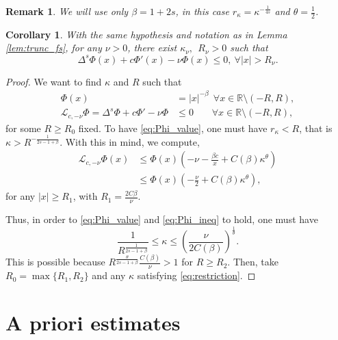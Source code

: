 \documentclass[11pt,a4paper]{amsart}
\newcommand{\Lop}{\mathcal{L}}
\newcommand{\R}{\mathbb{R}}
\newtheorem{cor}[thm]{Corollary}
\newtheorem{rmk}{Remark}
\begin{document}
\begin{rmk}
We will use only $\beta = 1+2s$, in this case $r_{\kappa} = \kappa^{-\frac{1}{4s}}$ and $\theta=\frac12$.
\end{rmk}

\begin{cor}
\label{cor:supersol}
With the same hypothesis and notation as in Lemma \ref{lem:trunc_fs}, for any $\nu > 0$, there exist $\kappa_{\nu},~~R_{\nu}>0$ such that 
\[\Delta^s \Phi(x) + c\Phi'(x) - \nu \Phi(x) \leq 0, ~ \forall |x|>R_{\nu}.\]
\end{cor}

\begin{proof}
We want to find $\kappa$ and $R$ such that
\begin{subequations}
\label{eq:Phi_supersol}
\begin{align}
\Phi(x) &= |x|^{-\beta} ~~ \forall x\in \R \setminus (-R,R), \label{eq:Phi_value}\\
\Lop_{c,-\nu}\Phi = \Delta^s \Phi +c\Phi' -\nu \Phi  &\leq 0 \hspace{23pt} \forall x\in \R \setminus (-R,R), \label{eq:Phi_ineq}
\end{align}
\end{subequations}
for some $R\geq R_0$ fixed. To have \eqref{eq:Phi_value}, one must have $r_{\kappa} < R$, that is $\kappa> R^{-\frac{1}{2s-1+\beta}}$. With this in mind, we compute,
\begin{align*}
\Lop_{c,-\nu}\Phi(x) &\leq \Phi(x) \left(-\nu -\frac{\beta c}{x} +C(\beta)\kappa^{\theta}\right) \\
&\leq \Phi(x) \left(-\frac{\nu}{2} + C(\beta) \kappa^{\theta} \right),
\end{align*}
for any $|x| \geq R_1$, with $ R_1= \frac{2C\beta}{\nu}$.

Thus, in order to \eqref{eq:Phi_value} and \eqref{eq:Phi_ineq} to hold, one must have
\begin{equation}
\label{eq:restriction}
\frac{1}{R^{\frac{1}{2s-1+\beta}}} \leq \kappa \leq\left( \frac{\nu}{2C(\beta)} \right)^{\frac1{\theta}}.
\end{equation}
This is possible because $R^{\frac{\theta}{2s-1+\beta}}\frac{C(\beta)}{\nu}  > 1$ for $R\geq R_2$. Then, take $R_0 = \max\{R_1, R_2\}$ and any $\kappa$ satisfying \eqref{eq:restriction}.
\end{proof}

\section{A priori estimates}
\label{sect:a_priori}
\end{document}
